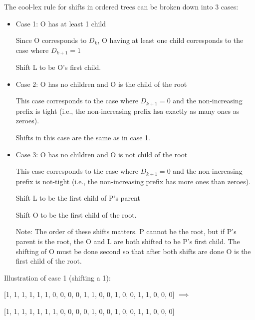 \documentclass{article}
\begin{document}
\noindent The cool-lex rule for shifts in ordered trees can be broken down into 3 cases:
\begin{itemize}
    \item Case 1: O has at least 1 child
	
	Since O corresponds to $D_k$, O having at least one child corresponds to the case where $D_{k+1}=1$ 

	
	Shift L to be O's first child. 


    \item Case 2: O has no children and O is the child of the root



	This case corresponds to the case where $D_{k+1}=0$ and the non-increasing prefix is tight (i.e., the non-increasing prefix hsa exactly as many ones as zeroes).
	
	Shifts in this case are the same as in case 1. 
    \item Case 3: O has no children and O is not child of the root

	This case corresponds to the case where $D_{k+1}=0$ and the non-increasing prefix is not-tight (i.e., the non-increasing prefix has more ones than zeroes). 

	Shift L to be the first child of P's parent

	Shift O to be the first child of the root. 

	Note: The order of these shifts matters. P cannot be the root, but if P's parent is the root, the O and L are both shifted to be P's first child. The shifting of O must be done second so that after both shifts are done O is the first child of the root. 


\end{itemize}


 Illustration of case 1 (shifting a 1): 

\bigskip

[1, 1, 1, 1, 1, 1, 0, 0, 0, 0, 1, 1, 0, 0, 1, 0, 0, 1, 1, 0, 0, 0] $\implies$

[1, 1, 1, 1, 1, 1, 1, 0, 0, 0, 0, 1, 0, 0, 1, 0, 0, 1, 1, 0, 0, 0]
\end{document}
